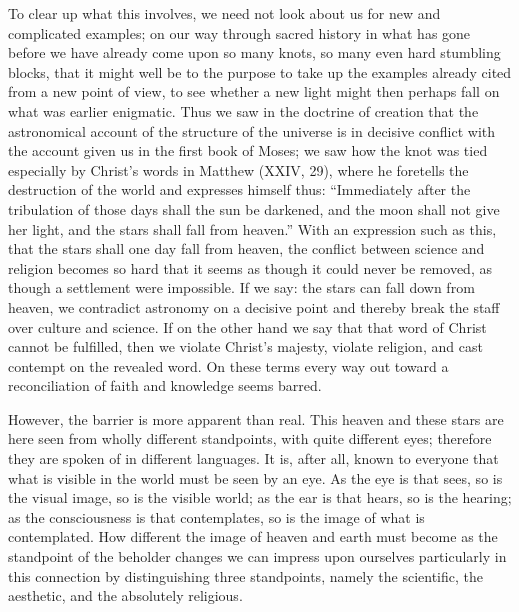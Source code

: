 \documentclass[12pt]{book}
\newcommand{\opage}[1]{\marginnote{\footnotesize\textit{[#1]}}}
\begin{document}
\opage{197}\setcounter{footnote}{0}%
To clear up what this involves, we need not look about us for new and
complicated examples; on our way through sacred history in what has gone
before we have already come upon so many knots, so many even hard
stumbling blocks, that it might well be to the purpose to take up the
examples already cited from a new point of view, to see whether a new
light might then perhaps fall on what was earlier enigmatic. Thus we saw in
the doctrine of creation that the astronomical account of the structure of
the universe is in decisive conflict with the account given us in the first
book of Moses; we saw how the knot was tied especially by Christ's words in
Matthew (XXIV, 29), where he foretells the destruction of the world and
expresses himself thus: ``Immediately after the tribulation of those days
shall the sun be darkened, and the moon shall not give her light, and the
stars shall fall from heaven.'' With an expression such as this, that the
stars shall one day fall from heaven, the conflict between science and
religion becomes so hard that it seems as though it could never be
removed, as though a settlement were impossible. If we say: the stars can
fall down from heaven, we contradict astronomy on a decisive point and
thereby break the staff over culture and science. If on the other hand we
say that that word of Christ cannot be fulfilled, then we violate Christ's
majesty, violate religion, and cast contempt on the revealed word. On these
terms every way out toward a reconciliation of faith and knowledge seems
barred.

However, the barrier is more apparent than real. This heaven and these
stars are here seen from wholly different standpoints, with quite different
eyes; therefore they are spoken of in different languages. It is, after
all, known to everyone that what is visible in the world must be seen by
an eye. As the eye is that sees, so is
\opage{198}\setcounter{footnote}{0}%
the visual image, so is the visible world; as the ear is that hears, so is
the hearing; as the consciousness is that contemplates, so is the image of
what is contemplated. How different the image of heaven and earth must
become as the standpoint of the beholder changes we can impress upon
ourselves particularly in this connection by distinguishing three
standpoints, namely the scientific, the aesthetic, and the absolutely
religious.
\end{document}
